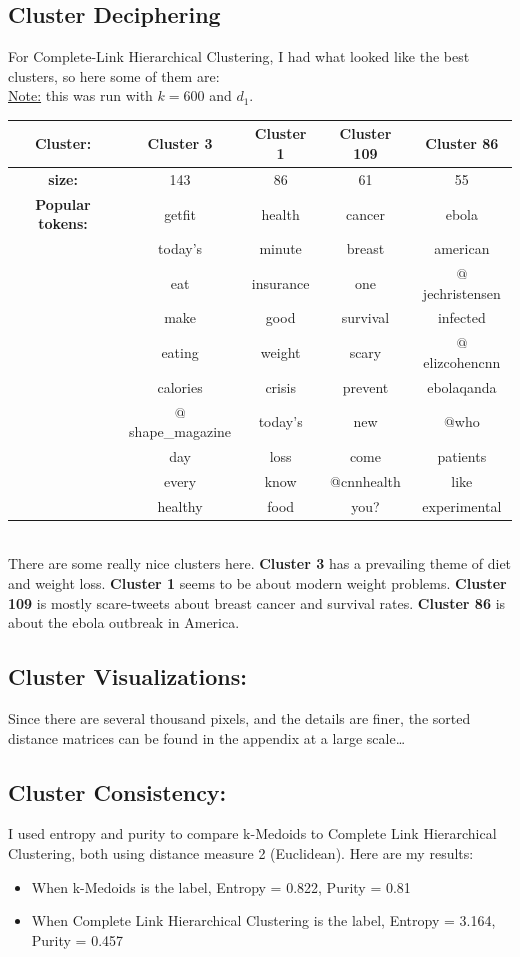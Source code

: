 \documentclass[fleqn]{article}
\begin{document}
\subsection*{Cluster Deciphering}
For Complete-Link Hierarchical Clustering, I had what looked like the best clusters, so here some of them are:\\
\underline{Note:} this was run with $k=600$ and $d_1$.\\
\newline
\begin{tabular}{|c|c|c|c|c|}
	\hline
	\textbf{Cluster:} &\textbf{Cluster 3}& \textbf{Cluster 1}&\textbf{Cluster 109}&\textbf{Cluster 86}\\
	\hline
	\textbf{size:}& 143 & 86 & 61&55\\
	\hline
	\textbf{Popular tokens:}& getfit& health&cancer&ebola\\
	&today's&minute&breast&american\\
	&eat&insurance&one&$@$jechristensen\\
	&make&good&survival&infected\\
	&eating&weight&scary&$@$elizcohencnn\\
	&calories&crisis&prevent &ebolaqanda\\
	&$@$shape\_magazine&today's&new& $@$who\\
	&day&loss&come &patients\\
	&every&know&@cnnhealth &like \\
	&healthy&food&you?&experimental\\
	\hline
\end{tabular}\\
\newline
There are some really nice clusters here. \textbf{Cluster 3} has a prevailing theme of diet and weight loss.  \textbf{Cluster 1} seems to be about modern weight problems. \textbf{Cluster 109} is mostly scare-tweets about breast cancer and survival rates.  \textbf{Cluster 86} is about the ebola outbreak in America.
\subsection{Cluster Visualizations:}
Since there are several thousand pixels, and the details are finer, the sorted distance matrices can be found in the appendix at a large scale\dots
\subsection{Cluster Consistency:}
I used entropy and purity to compare k-Medoids to Complete Link Hierarchical Clustering, both using distance measure 2 (Euclidean).  Here are my results:
\begin{itemize}
	\item When k-Medoids is the label, Entropy = 0.822, Purity = 0.81
	\item When Complete Link Hierarchical Clustering is the label, Entropy = 3.164, Purity = 0.457
\end{itemize}
\end{document}
